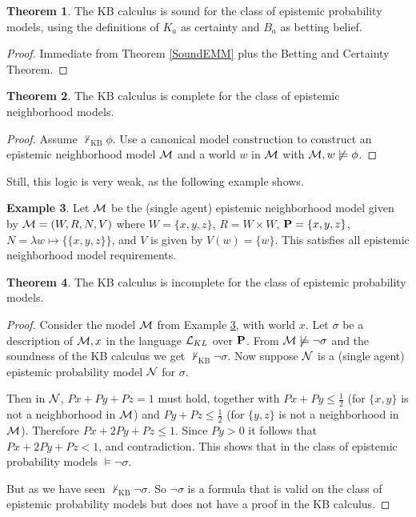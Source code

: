 \documentclass[12pt]{article}
\newcommand{\XXXcomment}[1]{}
\newcommand{\XXXcomment}[1]{\marginpar{\color{blue}{\footnotesize #1}}}
\theoremstyle{definition}
\newtheorem{theorem}{Theorem}[section]
\newtheorem{example}[theorem]{Example}
\newcommand{\M}{{\cal M}}      %
\newcommand{\N}{{\cal N}}      %
\newcommand{\Prop}{{\bf P}}    %
\newcommand{\Lang}{{\cal L}}   %
\begin{document}
\begin{theorem}
The KB calculus is sound for the class of epistemic probability models, using 
the definitions of $K_a$ as certainty and $B_a$ as betting belief. 
\end{theorem} 
\begin{proof}
Immediate from Theorem \ref{SoundEMM} plus the Betting and Certainty Theorem. 
\end{proof}

\begin{theorem} \label{completeEMM}
The KB calculus is complete for the class of epistemic neighborhood models.
\end{theorem} 
\begin{proof}
Assume $\not\vdash_{\text{KB}} \phi$. Use a canonical model
construction to construct an epistemic neighborhood model $\M$ and a world
$w$ in $\M$ with $\M, w \not\models \phi$.
\XXXcomment{We should spell out the details, for these cannot be gleaned from 
the Chellas book.}
\end{proof}

Still, this logic is very weak, as the following example shows. 

\begin{example} \label{EMMweakExample}
Let $\M$ be the (single agent) epistemic neighborhood model given by $\M =
(W,R,N,V)$ where $W = \{ x, y, z \}$, $R = W \times W$, $\Prop = \{ x,
y , z \}$, $N = \lambda w \mapsto \{ \{ x, y, z \} \}$, and $V$ is
given by $V(w) = \{ w \}$.  This satisfies all epistemic neighborhood model
requirements.
\end{example}

\begin{theorem} \label{incompleteEPM}
The KB calculus is incomplete for the class of epistemic probability models.
\end{theorem}
\begin{proof}
Consider the model $\M$ from Example \ref{EMMweakExample}, with 
world $x$. 
Let $\sigma$ be a description of $\M,x$ in the language $\Lang_{KL}$
over $\Prop$. From $\M \not\models \neg \sigma$ and the soundness of
the KB calculus we get $\not\vdash_{\text{KB}} \neg \sigma$.  Now
suppose $\N$ is a (single agent) epistemic probability model $\N$ for
$\sigma$.

Then in $\N$, $Px + Py + Pz = 1$ must hold, together with 
$Px + Py \leq \frac 1 2$ (for $\{ x,y\}$ is not a neighborhood in 
$\M$) and $Py + Pz \leq \frac 1 2$ (for $\{ y, z\}$ is not a 
neighborhood in $\M$). Therefore $Px + 2Py + Pz \leq 1$. 
Since $Py > 0$ it follows that $Px + 2Py + Pz < 1$, and contradiction. 
This shows that in the class of 
epistemic probability models $\models \neg \sigma$. 

But as we have seen $\not\vdash_{\text{KB}} \neg \sigma$. 
So $\neg \sigma$ is a formula that is valid on the class
of epistemic probability models but does not have a proof
in the KB calculus. 
\end{proof}
\end{document}
